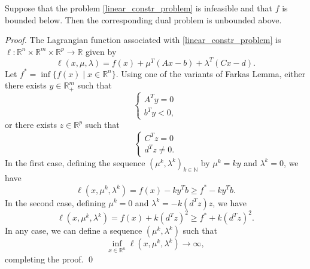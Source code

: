 \documentclass[smallextended,referee,envcountsect]{svjour3}
\newcommand{\R}{\mathbb{R}}
\newcommand{\N}{\mathbb{N}}
\begin{document}
\begin{lemma}
\label{lm:primal_infeasible}
Suppose that the problem \eqref{linear_constr_problem} is infeasible and that $f$ is 
bounded below. Then the corresponding dual problem is unbounded above.
\end{lemma}
\begin{proof}
The Lagrangian function associated with \eqref{linear_constr_problem} is 
$\ell:\R^n\times\R^m\times\R^p\to\R$ given by
$$
\ell(x,\mu,\lambda)=f(x)+\mu^T(Ax-b)+\lambda^T(Cx-d).
$$
Let $f^*=\inf\{f(x)\mid{x}\in\R^n\}$. Using one of the variants of Farkas Lemma, either 
there exists $y\in\R_+^m$ such that 
$$
\left\{\begin{array}{c} A^Ty=0 \\ b^Ty<0, \end{array}\right.
$$
or there exists $z\in\R^p$ such that 
$$
\left\{\begin{array}{c} C^Tz=0 \\ d^Tz\neq 0. \end{array}\right.
$$
In the first case, defining the sequence $(\mu^k,\lambda^k)_{k\in\N}$ by $\mu^k=ky$ and 
$\lambda^k=0$, we have 
$$
\ell(x,\mu^k,\lambda^k)=f(x)-ky^Tb\geq{f^*}-ky^Tb.
$$
In the second case, defining $\mu^k=0$ and $\lambda^k=-k(d^Tz)z$, we have 
$$
\ell(x,\mu^k,\lambda^k)=f(x)+k(d^Tz)^2\geq{f^*}+k(d^Tz)^2.
$$
In any case, we can define a sequence $(\mu^k,\lambda^k)$ such that 
$$
\displaystyle\inf_{x\in\R^n}\ell(x,\mu^k,\lambda^k)\to\infty,
$$ 
completing the proof.
\qed\end{proof}
\end{document}
